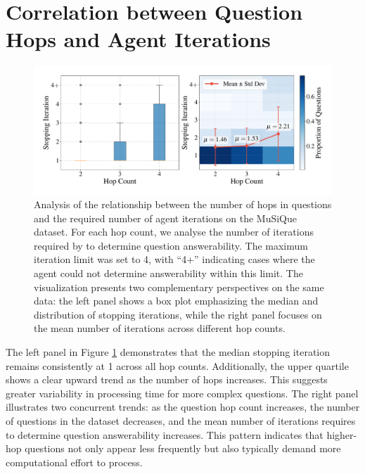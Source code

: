 \section{Correlation between Question Hops and Agent Iterations}
\label{appendix_sec:correlation_between_hops_and_agent_iterations}

\begin{figure}[thbp]
  \includegraphics[width=\textwidth]{figures/experiments/hop_vs_agent_iteration_correlation.pdf}
  \caption{Analysis of the relationship between the number of hops in questions and the required number of agent iterations on the MuSiQue dataset. For each hop count, we analyse the number of iterations required by \gear to determine question answerability. The maximum iteration limit was set to 4, with ``4+'' indicating cases where the agent could not determine answerability within this limit. The visualization presents two complementary perspectives on the same data: the left panel shows a box plot emphasizing the median and distribution of stopping iterations, while the right panel focuses on the mean number of iterations across different hop counts.}
  \label{fig:hop_vs_agent_iteration_correlation}
\end{figure}

The left panel in Figure \ref{fig:hop_vs_agent_iteration_correlation} demonstrates that the median stopping iteration remains consistently at 1 across all hop counts. Additionally, the upper quartile shows a clear upward trend as the number of hops increases. This suggests greater variability in processing time for more complex questions. The right panel illustrates two concurrent trends: as the question hop count increases, the number of questions in the dataset decreases, and the mean number of iterations \gear requires to determine question answerability increases. This pattern indicates that higher-hop questions not only appear less frequently but also typically demand more computational effort to process.
